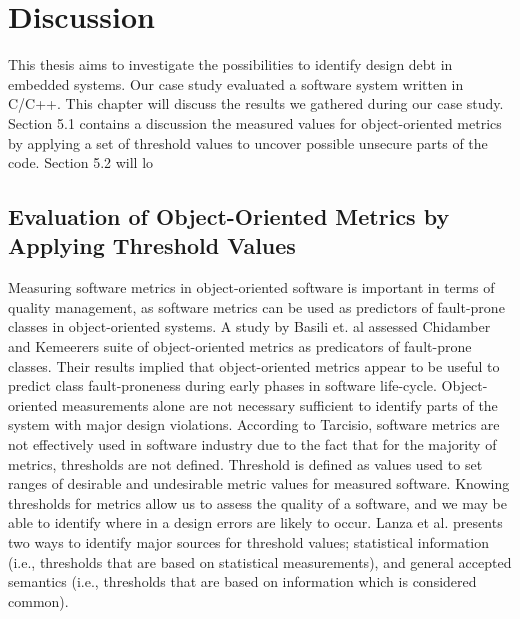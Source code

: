 
\chapter{Discussion}
This thesis aims to investigate the possibilities to identify design debt in embedded systems. Our case study evaluated a software system written in C/C++. This chapter will discuss the results we gathered during our case study. Section 5.1 contains a discussion the measured values for object-oriented metrics by applying a set of threshold values to uncover possible unsecure parts of the code. Section 5.2 will lo



\section{Evaluation of Object-Oriented Metrics by Applying Threshold Values}
Measuring software metrics in object-oriented software is important in terms of quality management\cite{tarcisio,ferreira2012identifying}, as software metrics can be used as predictors of fault-prone classes in object-oriented systems\cite{basili1996validation}. A study by Basili et. al\cite{basili1996validation} assessed Chidamber and Kemeerers\cite{chidamber1994metrics} suite of object-oriented metrics as predicators of fault-prone classes. Their results implied that object-oriented metrics appear to be useful to predict class fault-proneness during early phases in software life-cycle. Object-oriented measurements alone are not necessary sufficient to identify parts of the system with major design violations. According to Tarcisio, software metrics are not effectively used in software industry due to the fact that for the majority of metrics, thresholds are not defined\cite{tarcisio}. Threshold is defined as values used to set ranges of desirable and undesirable metric values for measured software\cite{ferreira2012identifying}. Knowing thresholds for metrics allow us to assess the quality of a software, and we may be able to identify where in a design errors are likely to occur. Lanza et al.\cite{lanza2007object} presents two ways to identify major sources for threshold values; statistical information (i.e., thresholds that are based on statistical measurements), and general accepted semantics (i.e., thresholds that are based on information which is considered common).  

